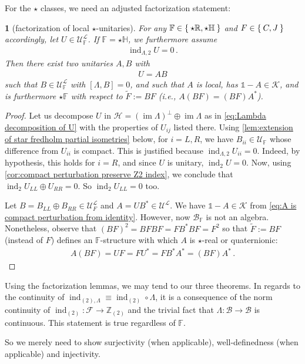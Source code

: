\documentclass[a4paper,10pt]{article}
\numberwithin{equation}{section}
\theoremstyle{plain}
\theoremstyle{plain}
\newtheorem{lem}[thm]{\protect\lemmaname}
\theoremstyle{plain}
\theoremstyle{plain}
\theoremstyle{plain}
\theoremstyle{remark}
\theoremstyle{definition}
\theoremstyle{plain}
\providecommand{\lemmaname}{Lemma}
\newcommand{\ZZ}{\mathbb{Z}}
\newcommand{\RR}{\mathbb{R}}
\newcommand{\FF}{\mathbb{F}}
\newcommand{\calB}{\mathcal{B}}
\newcommand{\calF}{\mathcal{F}}
\newcommand{\calU}{\mathcal{U}}
\newcommand{\calH}{\mathcal{H}}
\newcommand{\calK}{\mathcal{K}}
\newcommand{\calL}{\mathcal{L}}
\newcommand{\bbLambda}{\mathbb{\Lambda}}
\newcommand{\ti}[1]{\widetilde{#1}}
\newcommand{\Id}{\mathds{1}}
\newcommand{\HH}{\mathbb{H}}
\newcommand{\findex}{\operatorname{ind}}
\newcommand{\im}{\operatorname{im}}
\newcommand{\eq}[1]{\begin{align*}#1\end{align*}}
\begin{document}
	
	For the $\star$ classes, we need an adjusted factorization statement:  
	\begin{lem}[factorization of local $\star$-unitaries]\label{lem:factorization for star RH local unitaries} For any ${\FF\in\Set{\star\RR,\star\HH}}$ and $F\in\Set{C,J}$ accordingly, let $U\in\calU_\FF^\calL$. If $\FF=\star\HH$, we furthermore assume \eq{\findex_{\Lambda,2} U = 0\,.} Then there exist two unitaries $A,B$ with \eq{ U = AB } such that $B\in\calU^\calL_\FF$ with $[\Lambda,B]=0$, and such that $A$ is local, has $\Id-A\in\calK$, and is furthermore $\star\FF$ with respect to $\widetilde{F}:=BF$ (i.e., $A(BF)=(BF)A^*$).
	\end{lem}
	\begin{proof}
		Let us decompose $U$ in $\calH=(\im\Lambda)^\perp\oplus \im \Lambda $ as in \cref{eq:Lambda decomposition of U} with the properties of $U_{ij}$ listed there. Using \cref{lem:extension of star fredholm partial isometries} below, for $i=L,R$, we have $B_{ii}\in\calU_\FF$ whose difference from $U_{ii}$ is compact. This is justified because $\findex_{\Lambda,2} U_{ii} = 0$. Indeed, by hypothesis, this holds for $i=R$, and since $U$ is unitary, $\findex_{2} U = 0$. Now, using \cref{cor:compact perturbation preserve Z2 index}, we conclude that $\findex_{2} U_{LL}\oplus U_{RR} = 0$. So $\findex_{2} U_{LL} = 0$ too.
		
		Let $B=B_{LL}\oplus B_{RR}\in\calU_F^\calL$ and $A=UB^*\in \calU^\calL$. We have $\Id-A\in\calK$ from \cref{eq:A is compact perturbation from identity}. However, now $\calB_\FF$ is not an algebra. Nonetheless, observe that $(BF)^2=BFBF=FB^*BF=F^2$ so that $\ti{F}:=BF$ (instead of $F$) defines an $\FF$-structure with which $A$ is $\star$-real or quaternionic: \eq{A(BF)=UF=F U^*=F B^*A^*= (BF) A^*\,.}
	\end{proof}
	
	
	
	
	
	Using the factorization lemmas, we may tend to our three theorems. In regards to the continuity of $\findex_{(2),\Lambda}\equiv\findex_{(2)}\circ\bbLambda$, it is a consequence of the norm continuity of $\findex_{(2)}:\calF\to\ZZ_{(2)}$ and the trivial fact that $\bbLambda:\calB\to\calB$ is continuous. This statement is true regardless of $\FF$. 
	
	So we merely need to show surjectivity (when applicable), well-definedness (when applicable) and injectivity. 
	
\end{document}
